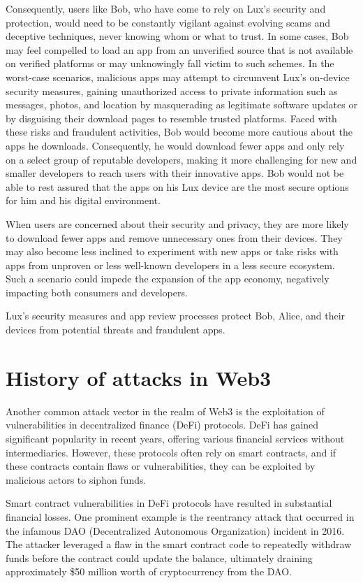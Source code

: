 \documentclass[11pt]{article}
\begin{document}
Consequently, users like Bob, who have come to rely on Lux's security and protection, would need to be constantly vigilant against evolving scams and deceptive techniques, never knowing whom or what to trust. In some cases, Bob may feel compelled to load an app from an unverified source that is not available on verified platforms or may unknowingly fall victim to such schemes. In the worst-case scenarios, malicious apps may attempt to circumvent Lux's on-device security measures, gaining unauthorized access to private information such as messages, photos, and location by masquerading as legitimate software updates or by disguising their download pages to resemble trusted platforms. Faced with these risks and fraudulent activities, Bob would become more cautious about the apps he downloads. Consequently, he would download fewer apps and only rely on a select group of reputable developers, making it more challenging for new and smaller developers to reach users with their innovative apps. Bob would not be able to rest assured that the apps on his Lux device are the most secure options for him and his digital environment.


When users are concerned about their security and privacy, they are more likely to download fewer apps and remove unnecessary ones from their devices. They may also become less inclined to experiment with new apps or take risks with apps from unproven or less well-known developers in a less secure ecosystem. Such a scenario could impede the expansion of the app economy, negatively impacting both consumers and developers.


Lux's security measures and app review processes protect Bob, Alice, and their devices from potential threats and fraudulent apps.


\section{History of attacks in Web3}

Another common attack vector in the realm of Web3 is the exploitation of vulnerabilities in decentralized finance (DeFi) protocols. DeFi has gained significant popularity in recent years, offering various financial services without intermediaries. However, these protocols often rely on smart contracts, and if these contracts contain flaws or vulnerabilities, they can be exploited by malicious actors to siphon funds.


Smart contract vulnerabilities in DeFi protocols have resulted in substantial financial losses. One prominent example is the reentrancy attack that occurred in the infamous DAO (Decentralized Autonomous Organization) incident in 2016. The attacker leveraged a flaw in the smart contract code to repeatedly withdraw funds before the contract could update the balance, ultimately draining approximately \$50 million worth of cryptocurrency from the DAO.
\end{document}
